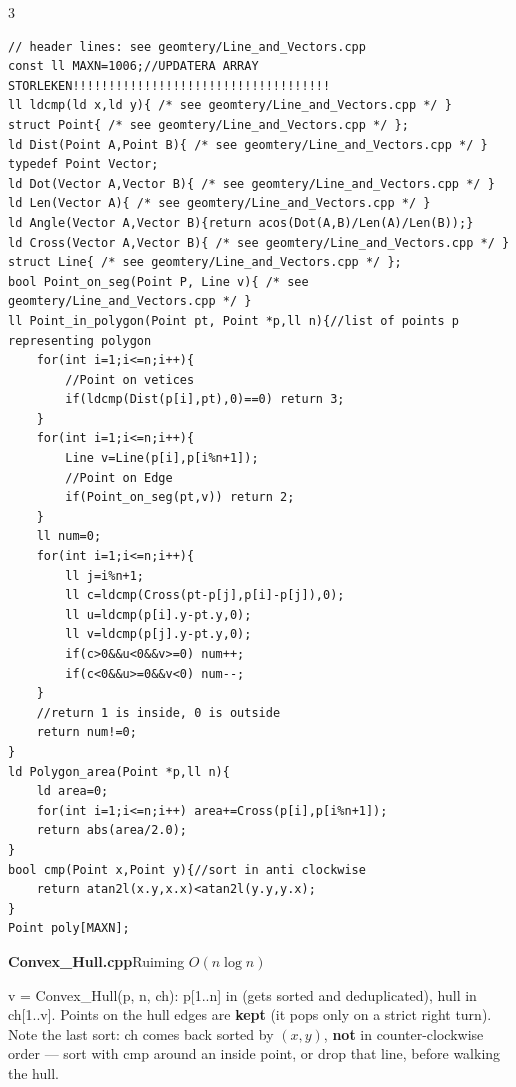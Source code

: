 \documentclass[9pt,a4paper]{extarticle}
\newcommand{\entry}[3]{%
  \addcontentsline{toc}{subsection}{#1}%
  \vspace{0.8ex}%
  \noindent\colorbox{hdbg}{\parbox{\dimexpr\columnwidth-2\fboxsep}{%
    \strut\textbf{#1}\hfill{\footnotesize\textsf{#2}}}}\par
  \vspace{0.4ex}%
  {\footnotesize #3\par}%
}
\newcommand{\code}[1]{{\ttfamily\small #1}}
\begin{document}
\begin{multicols*}{3}
\begin{lstlisting}[breaklines=true]
// header lines: see geomtery/Line_and_Vectors.cpp
const ll MAXN=1006;//UPDATERA ARRAY STORLEKEN!!!!!!!!!!!!!!!!!!!!!!!!!!!!!!!!!!!!
ll ldcmp(ld x,ld y){ /* see geomtery/Line_and_Vectors.cpp */ }
struct Point{ /* see geomtery/Line_and_Vectors.cpp */ };
ld Dist(Point A,Point B){ /* see geomtery/Line_and_Vectors.cpp */ }
typedef Point Vector;
ld Dot(Vector A,Vector B){ /* see geomtery/Line_and_Vectors.cpp */ }
ld Len(Vector A){ /* see geomtery/Line_and_Vectors.cpp */ }
ld Angle(Vector A,Vector B){return acos(Dot(A,B)/Len(A)/Len(B));}
ld Cross(Vector A,Vector B){ /* see geomtery/Line_and_Vectors.cpp */ }
struct Line{ /* see geomtery/Line_and_Vectors.cpp */ };
bool Point_on_seg(Point P, Line v){ /* see geomtery/Line_and_Vectors.cpp */ }
ll Point_in_polygon(Point pt, Point *p,ll n){//list of points p representing polygon
    for(int i=1;i<=n;i++){
        //Point on vetices
        if(ldcmp(Dist(p[i],pt),0)==0) return 3;
    }
    for(int i=1;i<=n;i++){
        Line v=Line(p[i],p[i%n+1]);
        //Point on Edge
        if(Point_on_seg(pt,v)) return 2;
    }
    ll num=0;
    for(int i=1;i<=n;i++){
        ll j=i%n+1;
        ll c=ldcmp(Cross(pt-p[j],p[i]-p[j]),0);
        ll u=ldcmp(p[i].y-pt.y,0);
        ll v=ldcmp(p[j].y-pt.y,0);
        if(c>0&&u<0&&v>=0) num++;
        if(c<0&&u>=0&&v<0) num--;
    }
    //return 1 is inside, 0 is outside
    return num!=0;
}
ld Polygon_area(Point *p,ll n){
    ld area=0;
    for(int i=1;i<=n;i++) area+=Cross(p[i],p[i%n+1]);
    return abs(area/2.0);
}
bool cmp(Point x,Point y){//sort in anti clockwise
    return atan2l(x.y,x.x)<atan2l(y.y,y.x);
}
Point poly[MAXN];
\end{lstlisting}

\entry{Convex\_Hull.cpp}{Ruiming \quad $O(n \log n)$}{\code{v = Convex\_Hull(p, n, ch)}: \code{p[1..n]} in (gets sorted and deduplicated), hull in \code{ch[1..v]}. Points on the hull edges are \textbf{kept} (it pops only on a strict right turn). Note the last \code{sort}: \code{ch} comes back sorted by $(x, y)$, \textbf{not} in counter-clockwise order --- sort with \code{cmp} around an inside point, or drop that line, before walking the hull.}


\end{multicols*}
\end{document}
